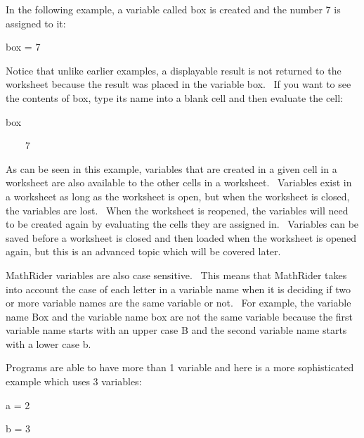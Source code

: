 \documentclass[12pt,twoside]{book}
\begin{document}
\bigskip

In the following example, a variable called box is created and the number 7 is assigned to it: 

\bigskip

box = 7

{\textbar}


\bigskip

Notice that unlike earlier examples, a displayable result is not returned to the worksheet because the result was placed in the variable box. \ If you want to see the contents of box, type its name into a blank cell and then evaluate the cell: 

\bigskip

box

{\textbar}

\ \ \ \ 7


\bigskip

As can be seen in this example, variables that are created in a given cell in a worksheet are also available to the other cells in a worksheet. \ Variables exist in a worksheet as long as the worksheet is open, but when the worksheet is closed, the variables are lost. \ When the worksheet is reopened, the variables will need to be created again by evaluating the cells they are assigned in. \ Variables can be saved before a worksheet is closed and then loaded when the worksheet is opened again, but this is an advanced topic which will be covered later. 

\bigskip

MathRider variables are also case sensitive. \ This means that MathRider takes into account the case of each letter in a variable name when it is deciding if two or more variable names are the same variable or not. \ For example, the variable name Box and the variable name box are not the same variable because the first variable name starts with an upper case {\textquotesingle}B{\textquotesingle} and the second variable name starts with a lower case {\textquotesingle}b{\textquotesingle}. 

\bigskip

Programs are able to have more than 1 variable and here is a more sophisticated example which uses 3 variables: 

\bigskip

a = 2

{\textbar}


\bigskip

b = 3

{\textbar}
\end{document}
